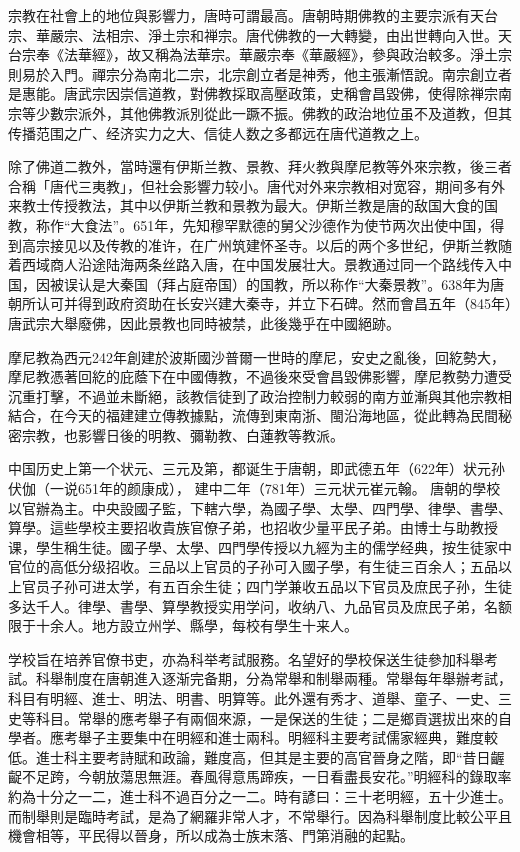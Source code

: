 宗教在社會上的地位與影響力，唐時可謂最高。唐朝時期佛教的主要宗派有天台宗、華嚴宗、法相宗、淨土宗和禅宗。唐代佛教的一大轉變，由出世轉向入世。天台宗奉《法華經》，故又稱為法華宗。華嚴宗奉《華嚴經》，參與政治較多。淨土宗則易於入門。禪宗分為南北二宗，北宗創立者是神秀，他主張漸悟說。南宗創立者是惠能。唐武宗因崇信道教，對佛教採取高壓政策，史稱會昌毀佛，使得除禅宗南宗等少數宗派外，其他佛教派別從此一蹶不振。佛教的政治地位虽不及道教，但其传播范围之广、经济实力之大、信徒人数之多都远在唐代道教之上。

除了佛道二教外，當時還有伊斯兰教、景教、拜火教與摩尼教等外來宗教，後三者合稱「唐代三夷教」，但社会影響力较小。唐代对外来宗教相对宽容，期间多有外来教士传授教法，其中以伊斯兰教和景教为最大。伊斯兰教是唐的敌国大食的国教，称作“大食法”。651年，先知穆罕默德的舅父沙德作为使节两次出使中国，得到高宗接见以及传教的准许，在广州筑建怀圣寺。以后的两个多世纪，伊斯兰教随着西域商人沿途陆海两条丝路入唐，在中国发展壮大。景教通过同一个路线传入中国，因被误认是大秦国（拜占庭帝国）的国教，所以称作“大秦景教”。638年为唐朝所认可并得到政府资助在长安兴建大秦寺，并立下石碑。然而會昌五年（845年）唐武宗大舉廢佛，因此景教也同時被禁，此後幾乎在中國絕跡。

摩尼教為西元242年創建於波斯國沙普爾一世時的摩尼，安史之亂後，回紇勢大，摩尼教憑著回紇的庇蔭下在中國傳教，不過後來受會昌毀佛影響，摩尼教勢力遭受沉重打擊，不過並未斷絕，該教信徒到了政治控制力較弱的南方並漸與其他宗教相結合，在今天的福建建立傳教據點，流傳到東南浙、閩沿海地區，從此轉為民間秘密宗教，也影響日後的明教、彌勒教、白蓮教等教派。

中国历史上第一个状元、三元及第，都诞生于唐朝，即武德五年（622年）状元孙伏伽（一说651年的颜康成）， 建中二年（781年）三元状元崔元翰。 唐朝的學校以官辦為主。中央設國子監，下轄六學，為國子學、太學、四門學、律學、書學、算學。這些學校主要招收貴族官僚子弟，也招收少量平民子弟。由博士与助教授课，學生稱生徒。國子學、太學、四門學传授以九經为主的儒学经典，按生徒家中官位的高低分级招收。三品以上官员的子孙可入國子學，有生徒三百余人；五品以上官员子孙可进太学，有五百余生徒；四门学兼收五品以下官员及庶民子孙，生徒多达千人。律學、書學、算學教授实用学问，收纳八、九品官员及庶民子弟，名额限于十余人。地方設立州学、縣學，每校有學生十来人。

学校旨在培养官僚书吏，亦為科举考試服務。名望好的學校保送生徒參加科舉考試。科舉制度在唐朝進入逐渐完备期，分為常舉和制舉兩種。常舉每年舉辦考試，科目有明經、進士、明法、明書、明算等。此外還有秀才、道舉、童子、一史、三史等科目。常舉的應考舉子有兩個來源，一是保送的生徒；二是鄉貢選拔出來的自學者。應考舉子主要集中在明經和進士兩科。明經科主要考試儒家經典，難度較低。進士科主要考詩賦和政論，難度高，但其是主要的高官晉身之階，即“昔日齷齪不足跨，今朝放蕩思無涯。春風得意馬蹄疾，一日看盡長安花。”明經科的錄取率約為十分之一二，進士科不過百分之一二。時有諺曰：三十老明經，五十少進士。而制舉則是臨時考試，是為了網羅非常人才，不常舉行。因為科舉制度比較公平且機會相等，平民得以晉身，所以成為士族末落、門第消融的起點。


